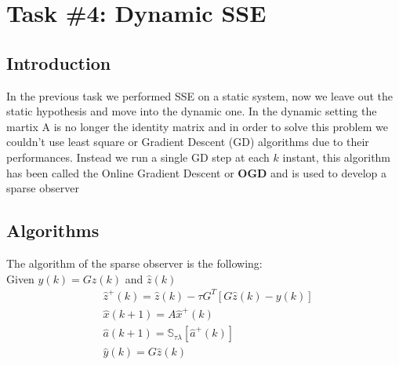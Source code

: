 
\section*{Task \#4: Dynamic SSE}
    \subsection*{Introduction}
    In the previous task we performed SSE on a static system, now we leave out the static hypothesis and move into the dynamic one.
    In the dynamic setting the martix A is no longer the identity matrix and in order to solve this problem we couldn't use least square or Gradient Descent (GD) algorithms due to their performances. Instead we run a single GD step at each $k$ instant, this algorithm has been called the Online Gradient Descent or \textbf{OGD} and is used to develop a sparse observer
    
    \subsection*{Algorithms}
    The algorithm of the sparse observer is the following:
    \\Given $y(k) = Gz(k)$ and $\hat{z}(k)$
    \begin{equation} \label{eq:OGD}
        \begin{aligned}
            &\hat{z}^+(k) = \hat{z}(k) - \tau G^T[G\hat{z}(k) - y(k)]\\
            &\hat{x}(k+1) = A\hat{x}^+(k)\\
            &\hat{a}(k+1) = \mathbb{S}_{\tau \lambda}[\hat{a}^+(k)]\\
            &\hat{y}(k) = G \hat{z}(k)\\
        \end{aligned}    
    \end{equation}   
    
